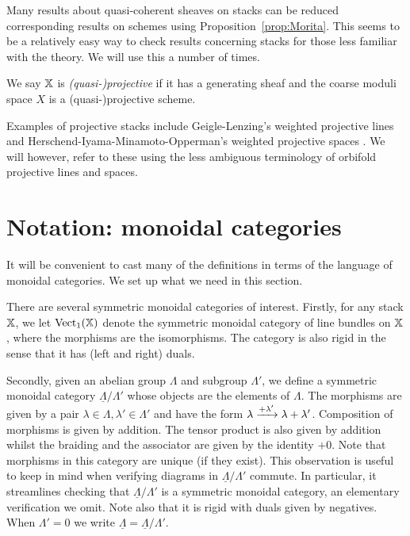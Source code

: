 \documentclass[12pt]{amsart}
\begin{document}
\begin{remark}  \label{rem:Morita}
Many results about quasi-coherent sheaves on stacks can be reduced corresponding results on schemes using Proposition~\ref{prop:Morita}. This seems to be a relatively easy way to check results concerning stacks for those less familiar with the theory. We will use this a number of times.
\end{remark}

\begin{definition}
We say $\mathbb{X}$ is {\em (quasi-)projective} if it has a generating sheaf and the coarse moduli space $X$ is a (quasi-)projective scheme.
\end{definition}

Examples of projective stacks include Geigle-Lenzing's weighted projective lines \cite{GL} and Herschend-Iyama-Minamoto-Opperman's weighted projective spaces \cite{HIMO}. We will however, refer to these using the less ambiguous terminology of orbifold projective lines and spaces. 

\section{Notation: monoidal categories}
\label{sec:monoidal}

It will be convenient to cast many of the definitions in terms of the language of monoidal categories. We set up what we need in this section.

There are several symmetric monoidal categories of interest. Firstly, for any stack $\mathbb{X}$, we let $\operatorname{Vect}_1 (\mathbb{X})$ denote the symmetric monoidal category of line bundles on $\mathbb{X}$, where the morphisms are the isomorphisms. The category is also rigid in the sense that it has (left and right) duals. 


Secondly, given an abelian group $\Lambda$ and subgroup $\Lambda'$, we define a symmetric monoidal category $\underline{\Lambda}/\Lambda'$ whose objects are the elements of $\Lambda$. The morphisms are given by a pair $\lambda \in \Lambda, \lambda' \in \Lambda'$ and have the form $\lambda \xrightarrow{+\lambda'} \lambda + \lambda'$. Composition of morphisms is given by addition. The tensor product is also given by addition whilst the braiding and the associator are given by the identity $+0$. Note that morphisms in this category are unique (if they exist). This observation is useful to keep in mind when verifying diagrams in $\underline{\Lambda}/\Lambda'$ commute. In particular, it streamlines checking that $\underline{\Lambda}/\Lambda'$ is a symmetric monoidal category, an elementary verification we omit. Note also that it is rigid with duals given by negatives. When $\Lambda' = 0$ we write $\underline{\Lambda} = \underline{\Lambda}/\Lambda'$.
\end{document}
